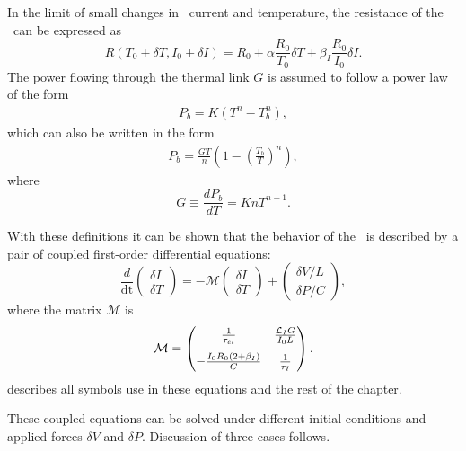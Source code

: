 In the limit of small changes in \TES\ current and temperature, the resistance of the \TES\ can be expressed as
\begin{equation}
R(T_0+\delta T,I_0+\delta I) = R_0 + \alpha \frac{R_0}{T_0} \delta T + %
									 \beta_I \frac{R_0}{I_0} \delta I.
\end{equation}
The power flowing through the thermal link $G$ is assumed to follow a power law of the form
\begin{eqnarray}
P_{b} = K(T^n - T^n_{b}),
\end{eqnarray}
which can also be written in the form
\begin{eqnarray}
P_{b} = \frac{GT}{n}\left(1 - \left(\frac{T_{b}}{T}\right)^n\right),
\end{eqnarray}
where
\begin{equation}
G \equiv \frac{d P_{b}}{dT} = K n T^{n-1}.
\end{equation}

With these definitions it can be shown \cite{irwin_transition-edge_2005} that the behavior of the \TES\ is described by a pair of coupled first-order differential equations:
\begin{equation}
\frac{d}{\mathop{dt}} \begin{pmatrix} \delta I \\ \delta T \end{pmatrix}
	= - \mathcal{M} \begin{pmatrix}	\delta I \\	\delta T \end{pmatrix}
      + \begin{pmatrix} \delta V / L \\ \delta P /C \end{pmatrix},
\end{equation}
where the matrix $\mathcal{M}$ is
\begin{equation}
\mathcal{M} = \begin{pmatrix}
		\frac{1}{\tau_{el}} & \frac{\mathcal{L}_I G}{I_0 L} \\[0.75em] 
		-\frac{I_0 R_0(2 + \beta_I)}{C} & \frac{1}{\tau_I}
    \end{pmatrix}.
\end{equation}
 describes all symbols use in these equations and the rest of the chapter.

These coupled equations can be solved under different initial conditions and applied forces $\delta V$ and $\delta P$.
Discussion of three cases follows.

